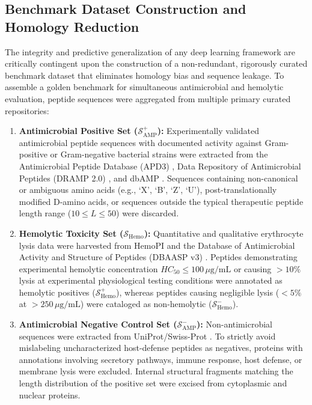 \documentclass[11pt,a4paper]{article}
\begin{document}
\subsection{Benchmark Dataset Construction and Homology Reduction}
The integrity and predictive generalization of any deep learning framework are critically contingent upon the construction of a non-redundant, rigorously curated benchmark dataset that eliminates homology bias and sequence leakage. To assemble a golden benchmark for simultaneous antimicrobial and hemolytic evaluation, peptide sequences were aggregated from multiple primary curated repositories:
\begin{enumerate}
    \item \textbf{Antimicrobial Positive Set ($\mathcal{S}_{\text{AMP}}^{+}$):} Experimentally validated antimicrobial peptide sequences with documented activity against Gram-positive or Gram-negative bacterial strains were extracted from the Antimicrobial Peptide Database (APD3) \cite{wang2016apd3}, Data Repository of Antimicrobial Peptides (DRAMP 2.0) \cite{kang2019dramp}, and dbAMP \cite{chung2020dbamp}. Sequences containing non-canonical or ambiguous amino acids (e.g., `X', `B', `Z', `U'), post-translationally modified D-amino acids, or sequences outside the typical therapeutic peptide length range ($10 \le L \le 50$) were discarded.
    \item \textbf{Hemolytic Toxicity Set ($\mathcal{S}_{\text{Hemo}}$):} Quantitative and qualitative erythrocyte lysis data were harvested from HemoPI \cite{chaudhary2016hemopi} and the Database of Antimicrobial Activity and Structure of Peptides (DBAASP v3) \cite{pirtskhalava2021dbaasp}. Peptides demonstrating experimental hemolytic concentration $HC_{50} \le 100\,\mu\text{g/mL}$ or causing $>10\%$ lysis at experimental physiological testing conditions were annotated as hemolytic positives ($\mathcal{S}_{\text{Hemo}}^{+}$), whereas peptides causing negligible lysis ($<5\%$ at $>250\,\mu\text{g/mL}$) were cataloged as non-hemolytic ($\mathcal{S}_{\text{Hemo}}^{-}$).
    \item \textbf{Antimicrobial Negative Control Set ($\mathcal{S}_{\text{AMP}}^{-}$):} Non-antimicrobial sequences were extracted from UniProt/Swiss-Prot \cite{uniprot2023uniprot}. To strictly avoid mislabeling uncharacterized host-defense peptides as negatives, proteins with annotations involving secretory pathways, immune response, host defense, or membrane lysis were excluded. Internal structural fragments matching the length distribution of the positive set were excised from cytoplasmic and nuclear proteins.
\end{enumerate}
\end{document}
